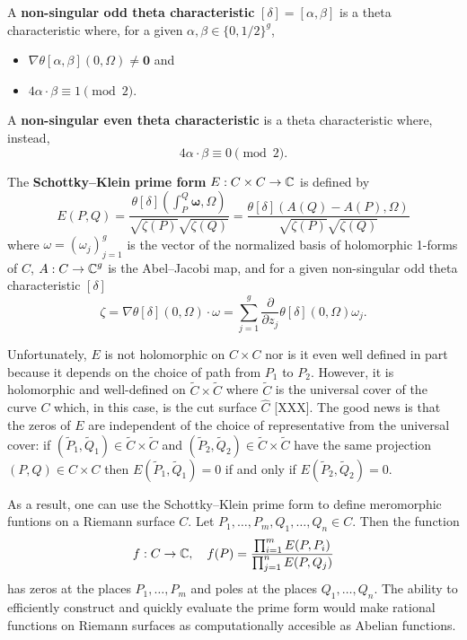 \begin{definition}
  A {\bf non-singular odd theta characteristic} $[\delta] = [\alpha,
    \beta]$ is a theta characteristic where, for a given $\alpha,\beta
  \in \{0,1/2\}^g$,
  \begin{itemize}
    \item $\nabla\theta[\alpha,\beta](0,\Omega) \neq \mathbf{0}$ and
    \item $4 \alpha \cdot \beta \equiv 1 \pmod{2}$.
  \end{itemize}
  A {\bf non-singular even theta characteristic} is a theta
  characteristic where, instead,
  \[
      4 \alpha \cdot \beta \equiv 0 \pmod{2}.
  \]
\end{definition}

\begin{definition}
  The {\bf Schottky--Klein prime form} $E:C \times C \to \operatorname{\mathbb{C}}$ is defined
  by
  \[
    E(P,Q) =
    \frac{
      \theta[\delta]
      \left( \int_{P}^{Q}\mathbf{\omega},\Omega \right)
    }
    {
      \sqrt{\zeta(P)}\sqrt{\zeta(Q)}
    }
    =
    \frac{
      \theta[\delta]
      \left( A(Q) - A(P), \Omega \right)
    }
    {
      \sqrt{\zeta(P)}\sqrt{\zeta(Q)}
    }
  \]
  where $\omega = (\omega_j)_{j=1}^g$ is the vector of the normalized
  basis of holomorphic 1-forms of $C$, $A:C \to \operatorname{\mathbb{C}}^g$ is the
  Abel--Jacobi map, and for a given non-singular odd theta
  characteristic $[\delta]$
  \[
    \zeta
    = \nabla \theta[\delta](0,\Omega) \cdot \omega
    = \sum_{j=1}^g \frac{\partial}{\partial z_j}
    \theta[\delta](0,\Omega) \omega_j.
  \]
\end{definition}

Unfortunately, $E$ is not holomorphic on $C \times C$ nor is it even
well defined in part because it depends on the choice of path from $P_1$
to $P_2$. However, it is holomorphic and well-defined on $\tilde{C}
\times \tilde{C}$ where $\tilde{C}$ is the universal cover of the curve
$C$ which, in this case, is the cut surface $\hat{C}$ [XXX]. The good
news is that the zeros of $E$ are independent of the choice of
representative from the universal cover: if $(\tilde{P}_1,\tilde{Q}_1)
\in \tilde{C} \times \tilde{C}$ and $(\tilde{P}_2,\tilde{Q}_2) \in
\tilde{C} \times \tilde{C}$ have the same projection $(P,Q) \in C \times
C$ then $E(\tilde{P}_1,\tilde{Q}_1) = 0$ if and only if
$E(\tilde{P}_2,\tilde{Q}_2) = 0$.

As a result, one can use the Schottky--Klein prime form to define
meromorphic funtions on a Riemann surface $C$. Let
$P_1,\ldots,P_m,Q_1,\ldots,Q_n \in C$. Then the function
\[
    f : C \to \operatorname{\mathbb{C}}, \quad
    f(P) = \frac{\prod_{i=1}^m E(P,P_i)}{\prod_{j=1}^n E(P,Q_j)}
\]
has zeros at the places $P_1,\ldots,P_m$ and poles at the places
$Q_1,\ldots,Q_n$. The ability to efficiently construct and quickly
evaluate the prime form would make rational functions on Riemann
surfaces as computationally accesible as Abelian functions.

